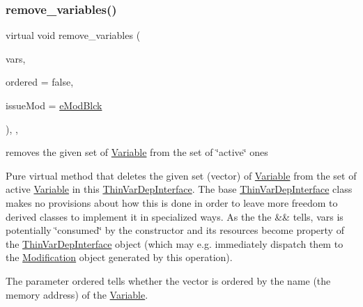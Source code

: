 \subsubsection{\texorpdfstring{remove\+\_\+variables()}{remove\_variables()}}
{\footnotesize\ttfamily virtual void remove\+\_\+variables (\begin{DoxyParamCaption}\item[{std\+::vector$<$ \mbox{\hyperlink{class_s_m_spp__di__unipi__it_1_1_variable}{Variable}} $\ast$$>$ \&\&}]{vars,  }\item[{const bool}]{ordered = {\ttfamily false},  }\item[{\mbox{\hyperlink{group___modification___t_y_p_e_s_ga544246d8c462e9a2d817c2c30797968f}{c\+\_\+\+Mod\+Param}}}]{issue\+Mod = {\ttfamily \mbox{\hyperlink{group___modification___t_y_p_e_s_gga48fddcdd03a03f49b7e389ca1ed938d4a21b14b26b1c0093a0905f6fc010bad29}{e\+Mod\+Blck}}} }\end{DoxyParamCaption})\hspace{0.3cm}{\ttfamily [inline]}, {\ttfamily [override]}, {\ttfamily [virtual]}}



removes the given set of \mbox{\hyperlink{class_s_m_spp__di__unipi__it_1_1_variable}{Variable}} from the set of \char`\"{}active\char`\"{} ones 

Pure virtual method that deletes the given set (vector) of \mbox{\hyperlink{class_s_m_spp__di__unipi__it_1_1_variable}{Variable}} from the set of active \mbox{\hyperlink{class_s_m_spp__di__unipi__it_1_1_variable}{Variable}} in this \mbox{\hyperlink{class_s_m_spp__di__unipi__it_1_1_thin_var_dep_interface}{Thin\+Var\+Dep\+Interface}}. The base \mbox{\hyperlink{class_s_m_spp__di__unipi__it_1_1_thin_var_dep_interface}{Thin\+Var\+Dep\+Interface}} class makes no provisions about how this is done in order to leave more freedom to derived classes to implement it in specialized ways. As the the \&\& tells, vars is potentially \char`\"{}consumed\char`\"{} by the constructor and its resources become property of the \mbox{\hyperlink{class_s_m_spp__di__unipi__it_1_1_thin_var_dep_interface}{Thin\+Var\+Dep\+Interface}} object (which may e.\+g. immediately dispatch them to the \mbox{\hyperlink{class_s_m_spp__di__unipi__it_1_1_modification}{Modification}} object generated by this operation).

The parameter ordered tells whether the vector is ordered by the name (the memory address) of the \mbox{\hyperlink{class_s_m_spp__di__unipi__it_1_1_variable}{Variable}}.

